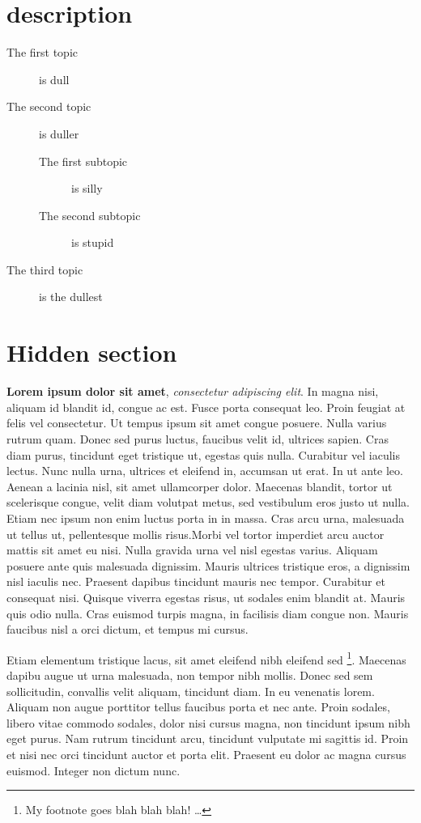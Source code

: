 \section*{description}
\begin{description}
	\item[The first topic] is dull
	\item[The second topic] is duller
	\begin{description}
		\item[The first subtopic] is silly
		\item[The second subtopic] is stupid
	\end{description}
	\item[The third topic] is the dullest
\end{description}


\clearpage

\tochide\section{Hidden section}
\textbf{Lorem ipsum dolor sit amet}, \textit{consectetur adipiscing elit}. In magna nisi, aliquam id blandit id, congue ac est. Fusce porta consequat leo. Proin feugiat at felis vel consectetur. Ut tempus ipsum sit amet congue posuere. Nulla varius rutrum quam. Donec sed purus luctus, faucibus velit id, ultrices sapien. Cras diam purus, tincidunt eget tristique ut, egestas quis nulla. Curabitur vel iaculis lectus. Nunc nulla urna, ultrices et eleifend in, accumsan ut erat. In ut ante leo. Aenean a lacinia nisl, sit amet ullamcorper dolor. Maecenas blandit, tortor ut scelerisque congue, velit diam volutpat metus, sed vestibulum eros justo ut nulla. Etiam nec ipsum non enim luctus porta in in massa. Cras arcu urna, malesuada ut tellus ut, pellentesque mollis risus.Morbi vel tortor imperdiet arcu auctor mattis sit amet eu nisi. Nulla gravida urna vel nisl egestas varius. Aliquam posuere ante quis malesuada dignissim. Mauris ultrices tristique eros, a dignissim nisl iaculis nec. Praesent dapibus tincidunt mauris nec tempor. Curabitur et consequat nisi. Quisque viverra egestas risus, ut sodales enim blandit at. Mauris quis odio nulla. Cras euismod turpis magna, in facilisis diam congue non. Mauris faucibus nisl a orci dictum, et tempus mi cursus.

Etiam elementum tristique lacus, sit amet eleifend nibh eleifend sed \footnote{My footnote goes blah blah blah! \dots}. Maecenas dapibu augue ut urna malesuada, non tempor nibh mollis. Donec sed sem sollicitudin, convallis velit aliquam, tincidunt diam. In eu venenatis lorem. Aliquam non augue porttitor tellus faucibus porta et nec ante. Proin sodales, libero vitae commodo sodales, dolor nisi cursus magna, non tincidunt ipsum nibh eget purus. Nam rutrum tincidunt arcu, tincidunt vulputate mi sagittis id. Proin et nisi nec orci tincidunt auctor et porta elit. Praesent eu dolor ac magna cursus euismod. Integer non dictum nunc.


